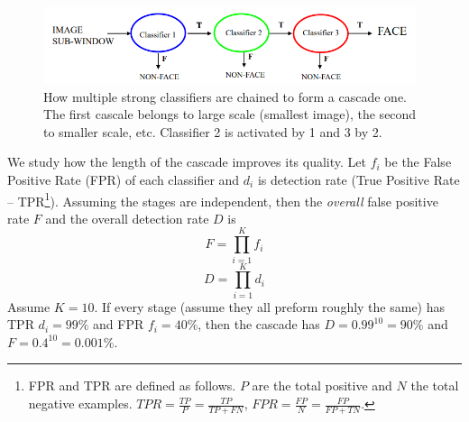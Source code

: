 \documentclass[a4paper]{article}
\begin{document}
\begin{figure}[H]
    \centering
    \includegraphics[height=2.25cm]{img/cascade_class.PNG}
    \caption{How multiple strong classifiers are chained to form a cascade one. The first cascale belongs to large scale (smallest image), the second to smaller scale, etc. Classifier 2 is activated by 1 and 3 by 2.}
    \label{fig:cascade_class}
\end{figure}
We study how the length of the cascade improves its quality. Let $f_i$ be the False Positive Rate (FPR) of each classifier and $d_i$ is detection rate (True Positive Rate -- TPR\footnote{FPR and TPR are defined as follows. $P$ are the total positive and $N $ the total negative examples. $TPR = \frac{TP}{P}=\frac{TP}{TP+FN}$, $FPR = \frac{FP}{N} = \frac{FP}{FP+TN}$.}). Assuming the stages are independent, then the \textit{overall} false positive rate $F$ and the overall detection rate $D$ is
\begin{equation}
    F = \prod\limits_{i=1}^{K}f_i
\end{equation}
\begin{equation}
    D = \prod\limits_{i=1}^{K}d_i
\end{equation}
 Assume $K=10$. If every stage (assume they all preform roughly the same) has TPR $d_i=99\%$ and FPR $f_i = 40\%$, then the cascade  has $D = 0.99^{10}=90\%$ and $F = 0.4^{10} = 0.001\%$.
\end{document}
